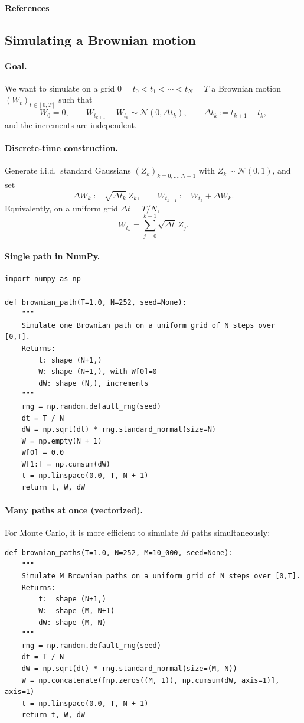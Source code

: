 \documentclass[11pt]{article}
\newcommand{\1}{\mathbf{1}}
\theoremstyle{plain}
\theoremstyle{definition}
\theoremstyle{remark}
\begin{document}
\paragraph{References}


\subsection{Simulating a Brownian motion}

\paragraph{Goal.}
We want to simulate on a grid $0=t_0<t_1<\cdots<t_N=T$ a Brownian motion
$(W_t)_{t\in[0,T]}$ such that
\[
W_0=0,
\qquad
W_{t_{k+1}}-W_{t_k}\sim \mathcal N(0,\Delta t_k),
\qquad
\Delta t_k:=t_{k+1}-t_k,
\]
and the increments are independent.

\paragraph{Discrete-time construction.}
Generate i.i.d.\ standard Gaussians $(Z_k)_{k=0,\dots,N-1}$ with $Z_k\sim \mathcal N(0,1)$, and set
\[
\Delta W_k := \sqrt{\Delta t_k}\,Z_k,
\qquad
W_{t_{k+1}} := W_{t_k} + \Delta W_k.
\]
Equivalently, on a uniform grid $\Delta t = T/N$,
\[
W_{t_k} = \sum_{j=0}^{k-1}\sqrt{\Delta t}\,Z_j.
\]

\newpage 
\paragraph{Single path in NumPy.}
\begin{verbatim}
import numpy as np

def brownian_path(T=1.0, N=252, seed=None):
    """
    Simulate one Brownian path on a uniform grid of N steps over [0,T].
    Returns:
        t: shape (N+1,)
        W: shape (N+1,), with W[0]=0
        dW: shape (N,), increments
    """
    rng = np.random.default_rng(seed)
    dt = T / N
    dW = np.sqrt(dt) * rng.standard_normal(size=N)
    W = np.empty(N + 1)
    W[0] = 0.0
    W[1:] = np.cumsum(dW)
    t = np.linspace(0.0, T, N + 1)
    return t, W, dW
\end{verbatim}

\paragraph{Many paths at once (vectorized).}
For Monte Carlo, it is more efficient to simulate $M$ paths simultaneously:
\begin{verbatim}
def brownian_paths(T=1.0, N=252, M=10_000, seed=None):
    """
    Simulate M Brownian paths on a uniform grid of N steps over [0,T].
    Returns:
        t:  shape (N+1,)
        W:  shape (M, N+1)
        dW: shape (M, N)
    """
    rng = np.random.default_rng(seed)
    dt = T / N
    dW = np.sqrt(dt) * rng.standard_normal(size=(M, N))
    W = np.concatenate([np.zeros((M, 1)), np.cumsum(dW, axis=1)], axis=1)
    t = np.linspace(0.0, T, N + 1)
    return t, W, dW
\end{verbatim}
\end{document}
